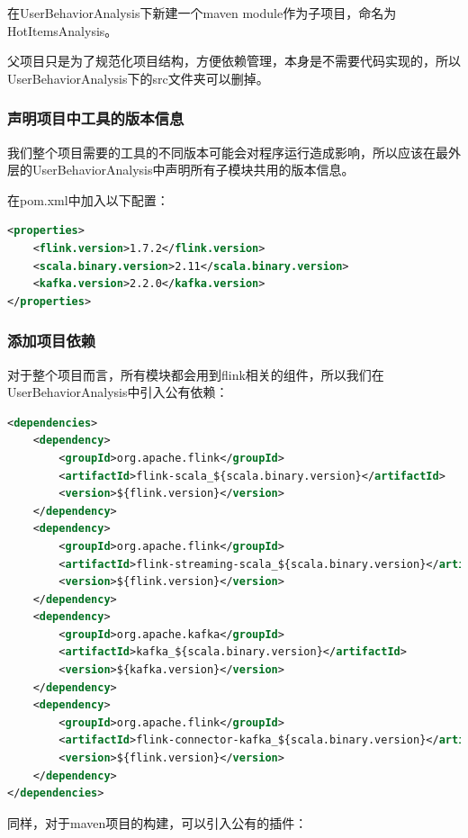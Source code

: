 \documentclass[oneside]{ctexbook}
\begin{document}
在UserBehaviorAnalysis下新建一个maven module作为子项目，命名为HotItemsAnalysis。

父项目只是为了规范化项目结构，方便依赖管理，本身是不需要代码实现的，所以UserBehaviorAnalysis下的src文件夹可以删掉。

\subsubsection{声明项目中工具的版本信息}

我们整个项目需要的工具的不同版本可能会对程序运行造成影响，所以应该在最外层的UserBehaviorAnalysis中声明所有子模块共用的版本信息。

在pom.xml中加入以下配置：

\begin{lstlisting}[language=xml, caption=UserBehaviorAnalysis/pom.xml]
<properties>
    <flink.version>1.7.2</flink.version>
    <scala.binary.version>2.11</scala.binary.version>
    <kafka.version>2.2.0</kafka.version>
</properties>
\end{lstlisting}

\subsubsection{添加项目依赖}

对于整个项目而言，所有模块都会用到flink相关的组件，所以我们在UserBehaviorAnalysis中引入公有依赖：

\begin{lstlisting}[language=xml, caption=UserBehaviorAnalysis/pom.xml]
<dependencies>
    <dependency>
        <groupId>org.apache.flink</groupId>
        <artifactId>flink-scala_${scala.binary.version}</artifactId>
        <version>${flink.version}</version>
    </dependency>
    <dependency>
        <groupId>org.apache.flink</groupId>
        <artifactId>flink-streaming-scala_${scala.binary.version}</artifactId>
        <version>${flink.version}</version>
    </dependency>
    <dependency>
        <groupId>org.apache.kafka</groupId>
        <artifactId>kafka_${scala.binary.version}</artifactId>
        <version>${kafka.version}</version>
    </dependency>
    <dependency>
        <groupId>org.apache.flink</groupId>
        <artifactId>flink-connector-kafka_${scala.binary.version}</artifactId>
        <version>${flink.version}</version>
    </dependency>
</dependencies>
\end{lstlisting}

同样，对于maven项目的构建，可以引入公有的插件：
\end{document}
